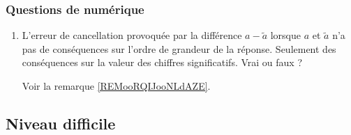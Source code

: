 \subsubsection{Questions de numérique}

\begin{enumerate}
    \item
        L'erreur de cancellation provoquée par la différence \( a-\tilde a\) lorsque \( a\) et \( \tilde a\) n'a pas de conséquences sur l'ordre de grandeur de la réponse. Seulement des conséquences sur la valeur des chiffres significatifs. Vrai ou faux ?

        Voir la remarque \ref{REMooRQIJooNLdAZE}.
\end{enumerate}

\subsection{Niveau difficile}


